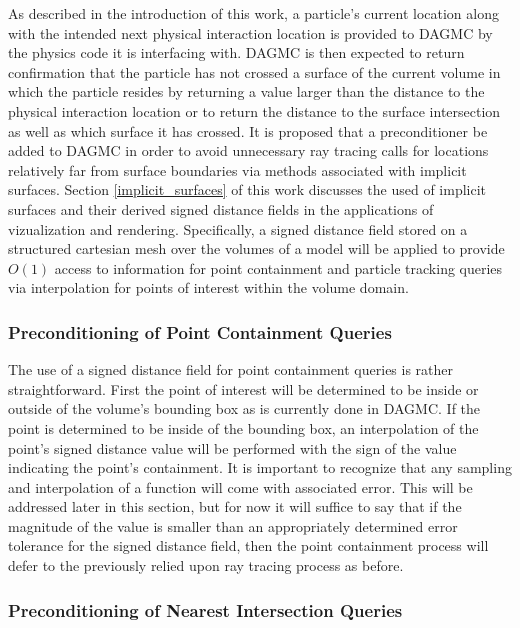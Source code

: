 \documentclass[12pt, a4paper]{article}
\begin{document}
As described in the introduction of this work, a particle's current location along with the intended next physical interaction location is provided to DAGMC by the physics code it is interfacing with. DAGMC is then expected to return confirmation that the particle has not crossed a surface of the current volume in which the particle resides by returning a value larger than the distance to the physical interaction location or to return the distance to the surface intersection as well as which surface it has crossed. It is proposed that a preconditioner be added to DAGMC in order to avoid unnecessary ray tracing calls for locations relatively far from surface boundaries via methods associated with implicit surfaces. Section \ref{implicit_surfaces} of this work discusses the used of implicit surfaces and their derived signed distance fields in the applications of vizualization and rendering. Specifically, a signed distance field stored on a structured cartesian mesh over the volumes of a model will be applied to provide $O(1)$ access to information for point containment and particle tracking queries via interpolation for points of interest within the volume domain.

\subsubsection{Preconditioning of Point Containment Queries}

The use of a signed distance field for point containment queries is rather straightforward. First the point of interest will be determined to be inside or outside of the volume's bounding box as is currently done in DAGMC. If the point is determined to be inside of the bounding box, an interpolation of the point's signed distance value will be performed with the sign of the value indicating the point's containment. It is important to recognize that any sampling and interpolation of a function will come with associated error. This will be addressed later in this section, but for now it will suffice to say that if the magnitude of the value is smaller than an appropriately determined error tolerance for the signed distance field, then the point containment process will defer to the previously relied upon ray tracing process as before.

\subsubsection{Preconditioning of Nearest Intersection Queries}
\end{document}
